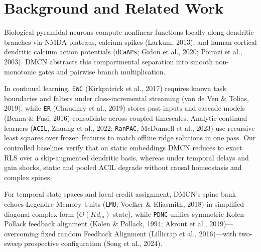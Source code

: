 \documentclass[11pt,a4paper]{article}
\begin{document}
\section{Background and Related Work}

Biological pyramidal neurons compute nonlinear functions locally along dendritic branches via NMDA plateaus, calcium spikes (Larkum, 2013), and human cortical dendritic calcium action potentials (\texttt{dCaAPs}; Gidon et al., 2020; Poirazi et al., 2003). DMCN abstracts this compartmental separation into smooth non-monotonic gates and pairwise branch multiplication.

In continual learning, \texttt{EWC} (Kirkpatrick et al., 2017) requires known task boundaries and falters under class-incremental streaming (van de Ven \& Tolias, 2019), while \texttt{ER} (Chaudhry et al., 2019) stores past inputs and cascade models (Benna \& Fusi, 2016) consolidate across coupled timescales. Analytic continual learners (\texttt{ACIL}, Zhuang et al., 2022; \texttt{RanPAC}, McDonnell et al., 2023) use recursive least squares over frozen features to match offline ridge solutions in one pass. Our controlled baselines verify that on static embeddings DMCN reduces to exact RLS over a skip-augmented dendritic basis, whereas under temporal delays and gain shocks, static and pooled ACIL degrade without causal homeostasis and complex spines.

For temporal state spaces and local credit assignment, DMCN's spine bank echoes Legendre Memory Units (\texttt{LMU}; Voelker \& Eliasmith, 2018) in simplified diagonal complex form ($O(K d_{\text{in}})$ state), while \texttt{PDNC} unifies symmetric Kolen--Pollack feedback alignment (Kolen \& Pollack, 1994; Akrout et al., 2019)---overcoming fixed random Feedback Alignment (Lillicrap et al., 2016)---with two-sweep prospective configuration (Song et al., 2024).
\end{document}
